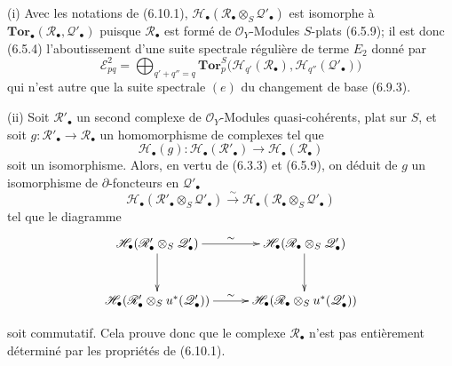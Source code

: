 \begin{remarks}[6.10.3]
\textnormal{(i)} Avec les notations de (6.10.1),
$\mathscr H_\bullet(\mathscr R_\bullet\otimes_S\mathscr Q'_\bullet)$ est
isomorphe à
$\mathbf{Tor}_\bullet(\mathscr R_\bullet,\mathscr Q'_\bullet)$ puisque
$\mathscr R_\bullet$ est formé de $\mathscr O_Y$-Modules $S$-plats (6.5.9); il
est donc (6.5.4) l'aboutissement d'une suite spectrale régulière de terme
$E_2$ donné par
\[
  \mathscr E_{pq}^2
  =
  \bigoplus_{q'+q''=q}
  \mathbf{Tor}_p^S
  \bigl(
    \mathscr H_{q'}(\mathscr R_\bullet),
    \mathscr H_{q''}(\mathscr Q'_\bullet)
  \bigr)
  \tag{6.10.3.1}\label{III.6.10.3.1.fr}
\]
qui n'est autre que la suite spectrale $(e)$ du changement de base (6.9.3).

\medskip
\textnormal{(ii)} Soit $\mathscr R'_\bullet$ un second complexe de
$\mathscr O_Y$-Modules quasi-cohérents, plat sur $S$, et soit
$g:\mathscr R'_\bullet\to\mathscr R_\bullet$ un homomorphisme de complexes tel
que
\[
  \mathscr H_\bullet(g):
  \mathscr H_\bullet(\mathscr R'_\bullet)
  \longrightarrow
  \mathscr H_\bullet(\mathscr R_\bullet)
\]
soit un isomorphisme. Alors, en vertu de (6.3.3) et (6.5.9), on déduit de $g$
un isomorphisme de $\partial$-foncteurs en $\mathscr Q'_\bullet$
\[
  \mathscr H_\bullet
  (\mathscr R'_\bullet\otimes_S\mathscr Q'_\bullet)
  \xrightarrow{\sim}
  \mathscr H_\bullet
  (\mathscr R_\bullet\otimes_S\mathscr Q'_\bullet)
\]
tel que le diagramme
\[
\xymatrix@C=28pt@R=30pt{
  \mathscr H_\bullet
  (\mathscr R'_\bullet\otimes_S\mathscr Q'_\bullet)
  \ar[r]^-{\sim}\ar[d]
  &
  \mathscr H_\bullet
  (\mathscr R_\bullet\otimes_S\mathscr Q'_\bullet)
  \ar[d]
  \\
  \mathscr H_\bullet
  (\mathscr R'_\bullet\otimes_Su^*(\mathscr Q'_\bullet))
  \ar[r]^-{\sim}
  &
  \mathscr H_\bullet
  (\mathscr R_\bullet\otimes_Su^*(\mathscr Q'_\bullet))
}
\]
\par\medskip\noindent
soit commutatif. Cela prouve donc que le complexe $\mathscr R_\bullet$ n'est
pas entièrement déterminé par les propriétés de (6.10.1).


\end{remarks}
